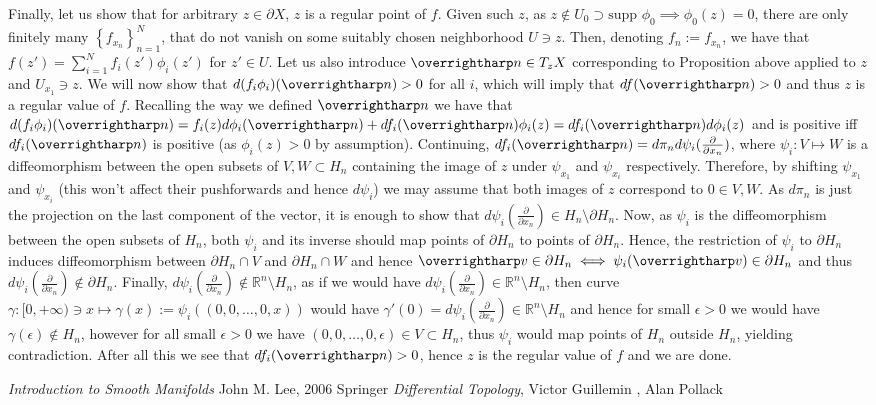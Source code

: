 \documentclass[8pt]{article} %
\begin{document}
\begin{enumerate}[label=\bfseries \arabic*.]
{		Finally, let us show that for arbitrary $z\in\partial X$, $z$ is a regular point of $f$. Given such $z$, as
		$z\notin U_0\supset\mbox{supp }\phi_0\implies \phi_0(z)=0$, there are only finitely many $\left\{
		f_{x_n}\right\}_{n=1}^N$, that do not vanish on some suitably chosen neighborhood $U\ni z$. Then,
		denoting $f_n:=f_{x_n}$, we have that
		$f(z')=\sum_{i=1}^N f_i(z')\phi_i(z')$ for $z'\in U$.
		Let us also introduce $\myvec{n}\in T_z X$ corresponding to Proposition above applied to $z$ and $U_{x_1}\ni z$. 
		We will now show that $d(f_i\phi_i)(\myvec{n})>0$ for all $i$, which will
		imply that $df(\myvec{n})>0$ and thus $z$ is a regular value of $f$. Recalling the way we defined $\myvec{n}$ we
		have that $d(f_i\phi_i)(\myvec{n})=f_i(z)d\phi_i(\myvec{n})+df_i(\myvec{n})\phi_i(z)=df_i(\myvec{n})d\phi_i(z)$
		and is positive iff $df_i(\myvec{n})$ is positive (as $\phi_i(z)>0$ by assumption).
		Continuing, $df_i(\myvec{n})=d\pi_n d\psi_i(\frac{\partial}{\partial x_n})$, where $\psi_i:V\mapsto W$
		 is a diffeomorphism
		 between the open subsets of $V,W\subset H_n$ containing the image of $z$ under $\psi_{x_1}$ and
		 $\psi_{x_i}$ respectively. Therefore, by shifting $\psi_{x_1}$ and $\psi_{x_i}$ (this won't affect
		 their pushforwards and hence $d\psi_i$) we may assume that both images of $z$ correspond to $0\in V,W$. 
		 As $d\pi_n$ is just the projection on the last component of the vector, it is enough to show that $d\psi_i(\frac{\partial}{\partial x_n})\in H_n
		 \setminus\partial H_n$. Now, as $\psi_i$ is the diffeomorphism between the open subsets of $H_n$, both $\psi_i$ and its
		 inverse should map points of $\partial H_n$ to points of $\partial H_n$. Hence, the restriction of $\psi_i$ to $\partial H_n$ induces
		 diffeomorphism between $\partial H_n\cap V$ and $\partial H_n\cap W$ and hence $\myvec{v}\in\partial H_n\iff \psi_i(\myvec{v})\in\partial H_n$ and
		 thus $d\psi_i(\frac{\partial}{\partial x_n})\notin\partial H_n$. Finally, $d\psi_i(\frac{\partial}{\partial x_n})\notin \mathbb{R}^n
		 \setminus H_n$, as if we would have $d\psi_i(\frac{\partial}{\partial x_n})\in\mathbb{R}^n\setminus H_n$, then curve $\gamma:
		 [0,+\infty)\ni x\mapsto\gamma(x):=\psi_i((0,0,\dots,0,x))$ would have $\gamma'(0)=d\psi_i(\frac{\partial}{\partial x_n})\in\mathbb{R}^n\setminus H_n$
		 and hence for small $\epsilon>0$ we would have $\gamma(\epsilon)\notin H_n$, however for all 
		 small $\epsilon>0$ we have $(0,0,\dots,0,\epsilon)\in V
		 \subset H_n$, thus
		 $\psi_i$ would map points of $H_n$ outside $H_n$, yielding contradiction. After all this we see that $df_i(\myvec{n})>0$, hence
		 $z$ is the regular value of $f$ and we are done.
			}
\end{enumerate}
\begin{thebibliography}{9}
	 {\em Introduction to Smooth Manifolds} John M. Lee, 2006 Springer
	 {\em Differential Topology}, Victor Guillemin , Alan Pollack
\end{thebibliography}
\end{document}
